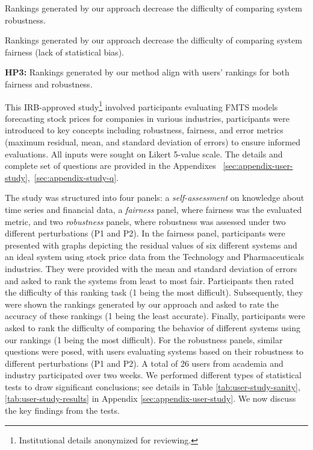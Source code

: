 {\color{blue}} Rankings generated by our approach decrease the difficulty of comparing system robustness.

{\color{blue}} Rankings generated by our approach decrease the difficulty of comparing system fairness (lack of statistical bias).

{\color{blue}\noindent
{\bf HP3:}} Rankings generated by our method align with users' rankings for both fairness and robustness.

This IRB-approved study\footnote{Institutional details anonymized for reviewing.} involved participants evaluating FMTS models forecasting stock prices for companies in various industries, participants were introduced to key concepts including robustness, fairness, and error metrics (maximum residual, mean, and standard deviation of errors) to ensure informed evaluations. All inputs were sought on Likert 5-value scale. The details and complete set of questions are provided in the Appendixes ~\ref{sec:appendix-user-study},~\ref{sec:appendix-study-q}.


The study was structured into four panels: a \textit{self-assessment} on knowledge about time series and financial data, a \textit{fairness} panel, where fairness was the evaluated metric, and two \textit{robustness} panels, where robustness was assessed under two different perturbations (P1 and P2).
In the fairness panel, participants were presented with graphs depicting the residual values of six different systems and an ideal system using stock price data from the Technology and Pharmaceuticals industries. They were provided with the mean and standard deviation of errors and asked to rank the systems from least to most fair. Participants then rated the difficulty of this ranking task
(1 being the most difficult).
Subsequently, they were shown the rankings generated by our approach and asked to rate the accuracy of these rankings 
(1 being the least accurate).
Finally, participants were asked to rank the difficulty of comparing the behavior of different systems using our rankings
(1 being the most difficult).
For the robustness panels, similar questions were posed, with users evaluating systems based on their robustness to different perturbations (P1 and P2). 
A total of 26 users from academia and industry participated over two weeks.
We performed different types of statistical tests to draw significant conclusions; see details in Table \ref{tab:user-study-sanity}, \ref{tab:user-study-results} in Appendix \ref{sec:appendix-user-study}. We now discuss the key findings from the tests.

